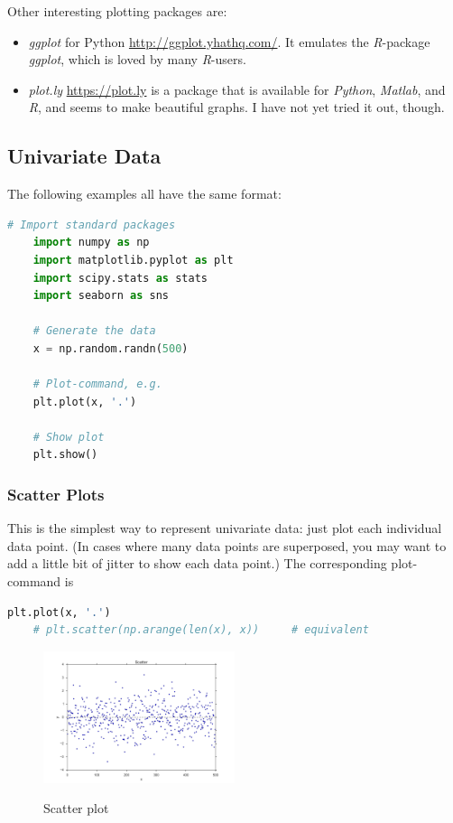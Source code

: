 Other interesting plotting packages are:

\begin{itemize}
  \item \emph{ggplot} for Python \url{http://ggplot.yhathq.com/}. It emulates the \emph{R}-package \emph{ggplot}, which is loved by many \emph{R}-users.
  \item \emph{plot.ly} \url{https://plot.ly} is a package that is available for \emph{Python}, \emph{Matlab}, and \emph{R}, and seems to make beautiful graphs. I have not yet tried it out, though.
\end{itemize}

\subsection{Univariate Data}

The following examples all have the same format:

\begin{lstlisting}[language=Python]
    # Import standard packages
    import numpy as np
    import matplotlib.pyplot as plt
    import scipy.stats as stats
    import seaborn as sns

    # Generate the data
    x = np.random.randn(500)

    # Plot-command, e.g.
    plt.plot(x, '.')

    # Show plot
    plt.show()
\end{lstlisting}


\subsubsection{Scatter Plots}

This is the simplest way to represent univariate data: just plot each individual data point. (In cases where many data points are superposed, you may want to add a little bit of jitter to show each data point.) The corresponding plot-command is

\begin{lstlisting}[language=Python]
    plt.plot(x, '.')
    # plt.scatter(np.arange(len(x), x))     # equivalent
\end{lstlisting}

\begin{figure}[H]
  \centering
  \includegraphics[width=0.5\textwidth]{../Images/scatterPlot.png}\\
  \caption{Scatter plot}
\end{figure}

